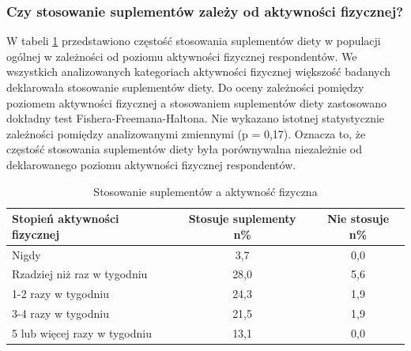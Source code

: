 \subsubsection{Czy stosowanie suplementów zależy od aktywności fizycznej?}

%
%

W tabeli \ref{tab:supl-akt} przedstawiono częstość stosowania suplementów diety w populacji ogólnej w zależności od poziomu aktywności fizycznej respondentów. We wszystkich analizowanych kategoriach aktywności fizycznej większość badanych deklarowała stosowanie suplementów diety. Do oceny zależności pomiędzy poziomem aktywności fizycznej a stosowaniem suplementów diety zastosowano dokładny test Fishera-Freemana-Haltona. Nie wykazano istotnej statystycznie zależności pomiędzy analizowanymi zmiennymi (p = 0,17). Oznacza to, że częstość stosowania suplementów diety była porównywalna niezależnie od deklarowanego poziomu aktywności fizycznej respondentów.

\begin{table}[H]
    \centering
    \caption{Stosowanie suplementów a aktywność fizyczna}
    \label{tab:supl-akt}
    \begin{tabular}{|l|c|c|}
        \hline
        \textbf{Stopień aktywności fizycznej} & \textbf{Stosuje suplementy n\%} & \textbf{Nie stosuje n\%} \\
        \hline
        \hline
        Nigdy & 3,7 & 0,0 \\
        \hline
        Rzadziej niż raz w tygodniu & 28,0 & 5,6 \\
        \hline
        1-2 razy w tygodniu	& 24,3 & 1,9 \\
        \hline
        3-4 razy w tygodniu & 21,5 & 1,9 \\
        \hline
        5 lub więcej razy w tygodniu & 13,1 & 0,0 \\
        \hline
    \end{tabular}
\end{table}


